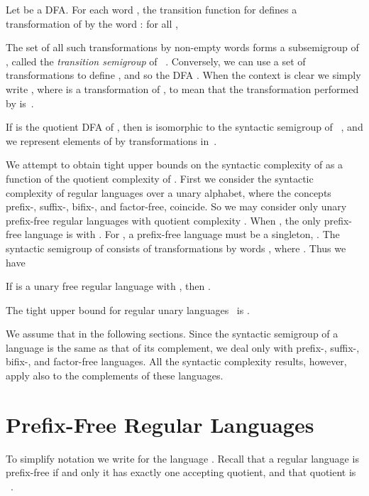 \documentclass{llncs}
\begin{document}
Let  be a DFA. For each word , the transition function for  defines a transformation  of  by the word : for all , 
 
The set  of all such transformations by non-empty words forms a subsemigroup of , called the \emph{transition semigroup} of ~\cite{Pin97}. 
Conversely, we can use a set   of transformations to define , and so the DFA . When the context is clear we simply write , where  is a transformation of , to mean that the transformation performed by  is~.

If   is the quotient DFA of , then  is isomorphic to the syntactic semigroup  of ~\cite{McNP71}, and we represent elements of  by transformations in~. 

We attempt to obtain tight upper bounds on the syntactic complexity  of  as a function of the quotient complexity  of .
First we consider the syntactic complexity of regular languages over a unary alphabet, where the  concepts prefix-, suffix-, bifix-, and factor-free, coincide. So we may consider only unary prefix-free regular languages  with quotient complexity . When , the only prefix-free language is  with . For , a prefix-free language  must be a singleton, . The syntactic semigroup  of  consists of  transformations  by words , where . Thus we have 

\begin{proposition}
If  is a unary free regular language with , then .
\end{proposition}


The tight upper bound for regular unary languages~\cite{HoKo04} is . 

We assume that  in the following sections. 
Since the syntactic semigroup of a language is the same as that of its complement, we deal only with prefix-, suffix-, bifix-, and factor-free languages. All the syntactic complexity results, however, apply also to the complements of these languages.
\goodbreak

\section{Prefix-Free Regular Languages}\label{sec:pf}
To simplify notation we write  for the language . Recall that a regular language  is prefix-free if and only it has exactly one accepting quotient, and that quotient is ~\cite{HSW09}.
\end{document}
